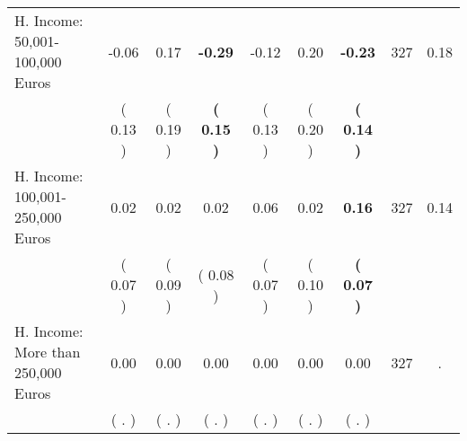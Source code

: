 \begin{tabular}{lcccccccc}
H. Income: 50,001-100,000 Euros &     -0.06 &      0.17 & \textbf{    -0.29} &     -0.12 &      0.20 & \textbf{    -0.23} & 327 &       0.18 \\ 
 & (     0.13 ) & (     0.19 ) & \textbf{(     0.15 )} & (     0.13 ) & (     0.20 ) & \textbf{(     0.14 )} & \\
H. Income: 100,001-250,000 Euros &      0.02 &      0.02 &      0.02 &      0.06 &      0.02 & \textbf{     0.16} & 327 &       0.14 \\ 
 & (     0.07 ) & (     0.09 ) & (     0.08 ) & (     0.07 ) & (     0.10 ) & \textbf{(     0.07 )} & \\
H. Income: More than 250,000 Euros &      0.00 &      0.00 &      0.00 &      0.00 &      0.00 &      0.00 & 327 &          . \\ 
 & (        . ) & (        . ) & (        . ) & (        . ) & (        . ) & (        . ) & \\
\bottomrule
\end{tabular}
